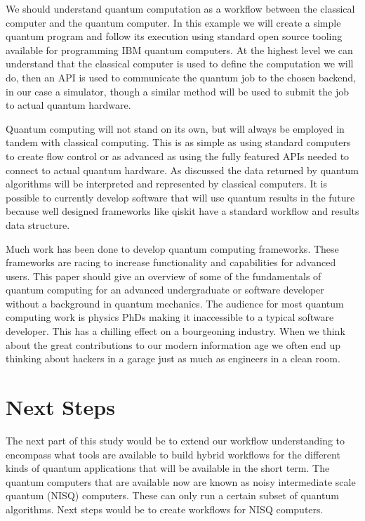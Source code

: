 \documentclass[conference]{IEEEtran}
\begin{document}
We should understand quantum computation as a workflow between the classical computer and the quantum computer. In this example we will create a simple quantum program and follow its execution using standard open source tooling available for programming IBM quantum computers. At the highest level we can understand that the classical computer is used to define the computation we will do, then an API is used to communicate the quantum job to the chosen backend, in our case a simulator, though a similar method will be used to submit the job to actual quantum hardware.

Quantum computing will not stand on its own, but will always be employed in tandem with classical computing. This is as simple as using standard computers to create flow control or as advanced as using the fully featured APIs needed to connect to actual quantum hardware. As discussed the data returned by quantum algorithms will be interpreted and represented by classical computers. It is possible to currently develop software that will use quantum results in the future because well designed frameworks like qiskit have a standard workflow and results data structure. 

Much work has been done to develop quantum computing frameworks. These frameworks are racing to increase functionality and capabilities for advanced users. This paper should give an overview of some of the fundamentals of quantum computing for an advanced undergraduate or software developer without a background in quantum mechanics. The audience for most quantum computing work is physics PhDs making it inaccessible to a typical software developer. This has a chilling effect on a bourgeoning industry. When we think about the great contributions to our modern information age we often end up thinking about hackers in a garage just as much as engineers in a clean room.

\section{Next Steps}

The next part of this study would be to extend our workflow understanding to encompass what tools are available to build hybrid workflows for the different kinds of quantum applications that will be available in the short term. The quantum computers that are available now are known as noisy intermediate scale quantum (NISQ) computers. These can only run a certain subset of quantum algorithms. Next steps would be to create workflows for NISQ computers. 
\end{document}
